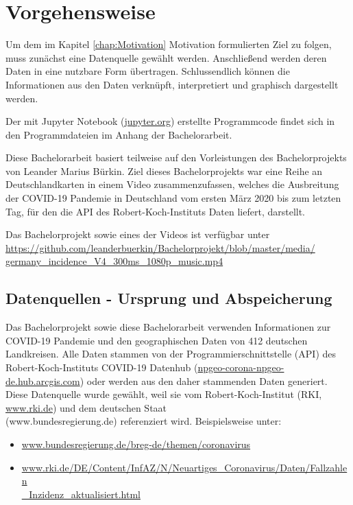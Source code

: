 \chapter{Vorgehensweise}\label{chap:Vorgehensweise}
Um dem im Kapitel \glqq{}\ref{chap:Motivation} Motivation\grqq{} formulierten Ziel zu folgen, muss zunächst eine Datenquelle gewählt werden.
Anschließend werden deren Daten in eine nutzbare Form übertragen.
Schlussendlich können die Informationen aus den Daten verknüpft, interpretiert und graphisch dargestellt werden.

Der mit Jupyter Notebook (\href{jupyter.org}{jupyter.org}) erstellte Programmcode findet sich in den Programmdateien im Anhang der Bachelorarbeit.

Diese Bachelorarbeit basiert teilweise auf den Vorleistungen des Bachelorprojekts von Leander Marius Bürkin.
Ziel dieses Bachelorprojekts war eine Reihe an Deutschlandkarten in einem Video zusammenzufassen, welches die Ausbreitung der COVID-19 Pandemie in Deutschland vom ersten März 2020 bis zum letzten Tag, für den die API des Robert-Koch-Instituts Daten liefert, darstellt.


Das Bachelorprojekt sowie eines der Videos ist verfügbar unter\\
\href{https://github.com/leanderbuerkin/Bachelorprojekt/blob/master/media/germany_incidence_V4_300ms_1080p_music.mp4}{https://github.com/leanderbuerkin/Bachelorprojekt/blob/master/media/}\\
\href{https://github.com/leanderbuerkin/Bachelorprojekt/blob/master/media/germany_incidence_V4_300ms_1080p_music.mp4}{germany\_incidence\_V4\_300ms\_1080p\_music.mp4}

\section{Datenquellen - Ursprung und Abspeicherung}\label{sec:Datenquelle}

Das Bachelorprojekt sowie diese Bachelorarbeit verwenden Informationen zur COVID-19 Pandemie und den geographischen Daten von 412 deutschen Landkreisen. Alle Daten stammen von der Programmierschnittstelle (API) des Robert-Koch-Instituts \glqq{}COVID-19 Datenhub\grqq{}
(\href{npgeo-corona-npgeo-de.hub.arcgis.com}{npgeo-corona-npgeo-de.hub.arcgis.com}) oder werden aus den daher stammenden Daten generiert. Diese Datenquelle wurde gewählt, weil sie vom Robert-Koch-Institut (RKI, \href{www.rki.de}{www.rki.de}) und dem deutschen Staat\\
 (www.bundesregierung.de) referenziert wird. Beispielsweise unter:
\begin{itemize}
    \item \href{www.bundesregierung.de/breg-de/themen/coronavirus}{www.bundesregierung.de/breg-de/themen/coronavirus}
    \item \href{www.rki.de/DE/Content/InfAZ/N/Neuartiges_Coronavirus/Daten/Fallzahlen_Inzidenz_aktualisiert.html}{www.rki.de/DE/Content/InfAZ/N/Neuartiges\_Coronavirus/Daten/Fallzahlen}\\
    \href{www.rki.de/DE/Content/InfAZ/N/Neuartiges_Coronavirus/Daten/Fallzahlen_Inzidenz_aktualisiert.html}{\_Inzidenz\_aktualisiert.html}
\end{itemize}

